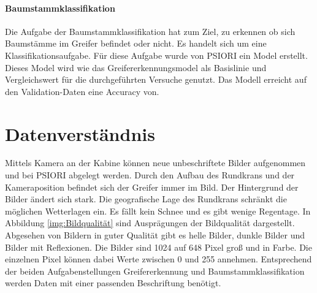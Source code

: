 		
	\paragraph{Baumstammklassifikation} Die Aufgabe der Baumstammklassifikation hat zum Ziel, zu erkennen ob sich Baumstämme im Greifer befindet oder nicht. Es handelt sich um eine Klassifikationsaufgabe. Für diese Aufgabe wurde von PSIORI ein Model erstellt. Dieses Model wird wie das Greifererkennungsmodel als Basislinie und Vergleichswert für die durchgeführten Versuche genutzt. Das Modell erreicht auf den Validation-Daten eine Accuracy von.

	\section{Datenverständnis}
	\label{sec:DataUnderstanding}
	Mittels Kamera an der Kabine können neue unbeschriftete Bilder aufgenommen und bei PSIORI abgelegt werden. Durch den Aufbau des Rundkrans und der Kameraposition befindet sich der Greifer immer im Bild. Der Hintergrund der Bilder ändert sich stark. Die geografische Lage des Rundkrans schränkt die möglichen Wetterlagen ein. Es fällt kein Schnee und es gibt wenige Regentage. In Abbildung  \ref{img:Bildqualität} sind Ausprägungen der Bildqualität dargestellt. Abgesehen von Bildern in guter Qualität gibt es helle Bilder, dunkle Bilder und Bilder mit Reflexionen. Die Bilder sind 1024 auf 648 Pixel groß und in Farbe. Die einzelnen Pixel können dabei Werte zwischen 0 und 255 annehmen. 
	Entsprechend der beiden Aufgabenstellungen Greifererkennung und Baumstammklassifikation werden Daten mit einer passenden Beschriftung benötigt.
	

